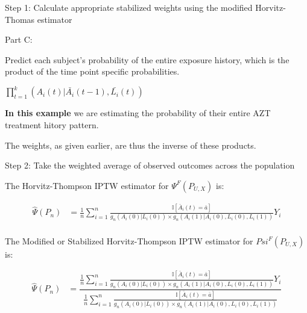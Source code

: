 \documentclass[ignorenonframetext,]{beamer}
\begin{document}
\begin{frame}{Step 1: Calculate appropriate stabilized weights using the
modified Horvitz-Thomas estimator}

\begin{block}{Part C:}

Predict each subject's probability of the entire exposure history, which
is the product of the time point specific probabilities.

\vspace{6mm}

\(\prod_{t=1}^k(A_i(t) | \bar{A_i}(t-1),\bar{L_i}(t))\)

\vspace{6mm}

\textbf{In this example} we are estimating the probability of their
entire AZT treatment hitory pattern.

\vspace{4mm}

The weights, as given earlier, are thus the inverse of these products.

\end{block}

\end{frame}

\begin{frame}{Step 2: Take the weighted average of observed outcomes
across the population}

\vspace{3mm}

The Horvitz-Thompson IPTW estimator for \(\Psi^F\left(P_{U,X}\right)\)
is:

\begin{align*}
\hat{\Psi}(P_n) & =\frac{1}{n}\sum_{i=1}^n\frac{\mathbb{I}[\bar{A}_i(t)=\bar{a}]}{g_n(A_i(0)|L_i(0))\times g_n(A_i(1)|A_i(0), L_i(0), L_i(1))}Y_i\\
\end{align*}

The Modified or Stabilized Horvitz-Thompson IPTW estimator for
\(Psi^F\left(P_{U,X}\right)\) is:

\begin{align*}
\hat{\Psi}(P_n) & =\dfrac{\frac{1}{n}\sum_{i=1}^n\frac{\mathbb{I}[\bar{A}_i(t)=\bar{a}]}{g_n(A_i(0)|L_i(0))\times g_n(A_i(1)|A_i(0), L_i(0), L_i(1))}Y_i}{\frac{1}{n}\sum_{i=1}^n\frac{\mathbb{I}[\bar{A}_i(t)=\bar{a}]}{g_n(A_i(0)|L_i(0))\times g_n(A_i(1)|A_i(0), L_i(0), L_i(1))}}\\
\end{align*}

\end{frame}
\end{document}
